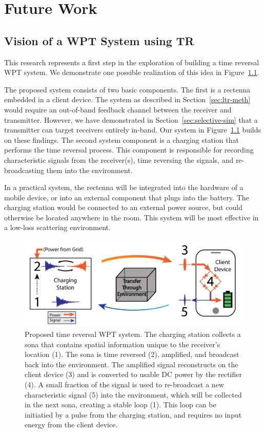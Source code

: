 \chapter{Future Work}
\label{ch:future}


\section{Vision of a WPT System using TR}
\label{sec:future-roadmap}
This research represents a first step in the exploration of building a
time reversal WPT system.
%
We demonstrate one possible realization of this idea in Figure~\ref{fig:SysImage}.


The proposed system consists of two basic components.
%
The first is a rectenna embedded in a client device.
%
The system as described in Section~\ref{sec:ltr-meth} would require an
out-of-band feedback channel between the receiver and transmitter. However, we
have demonstrated in Section~\ref{sec:selective-sim} that a transmitter can target
receivers entirely in-band.
%
Our system in Figure~\ref{fig:SysImage} builds on these findings.
%
The second system component is a charging station that performs the time reversal process.
%
This component is responsible for recording characteristic signals from the
receiver(s), time reversing the signals, and re-broadcasting them into the
environment.



In a practical system, the rectenna will be integrated into the hardware of a
mobile device, or into an external component that plugs into the battery.
%
The charging station would be connected to an external power source, but
could otherwise be located anywhere in the room. This system will be most effective in a low-loss scattering environment.

\begin{figure}[t]
\centering
\includegraphics[width=\columnwidth]{figs/future/WPTSys}
\caption[Proposed Time Reversal System]{Proposed time reversal WPT system. The charging station collects a sona that contains  spatial information unique to the receiver's location (1). The sona is time reversed (2), amplified, and broadcast back into the environment. The amplified signal reconstructs on the client device (3) and is converted to usable DC power by the rectifier (4). A small fraction of the signal is used to re-broadcast a new characteristic signal (5) into the environment, which will be collected in the next sona, creating a stable loop (1). This loop can be initiatied by a pulse from the charging station, and requires no input energy from the client device.}
\label{fig:SysImage}
\end{figure}

